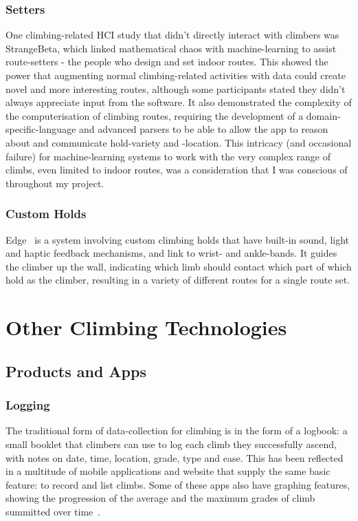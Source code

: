 \subsubsection{Setters}
One climbing-related HCI study that didn't directly interact with climbers was StrangeBeta\cite{strangebeta}, which linked mathematical chaos with machine-learning to assist route-setters - the people who design and set indoor routes.
This showed the power that augmenting normal climbing-related activities with data could create novel and more interesting routes, although some participants stated they didn't always appreciate input from the software.
It also demonstrated the complexity of the computerisation of climbing routes, requiring the development of a domain-specific-language and advanced parsers to be able to allow the app to reason about and communicate hold-variety and -location.
This intricacy (and occasional failure) for machine-learning systems to work with the very complex range of climbs, even limited to indoor routes, was a consideration that I was conscious of throughout my project.


\subsubsection{Custom Holds}
Edge~\cite{edgeinteractive} is a system involving custom climbing holds that have built-in sound, light and haptic feedback mechanisms, and link to wrist- and ankle-bands.
It guides the climber up the wall, indicating which limb should contact which part of which hold as the climber, resulting in a variety of different routes for a single route set.




\section{Other Climbing Technologies}
\subsection{Products and Apps}
\subsubsection{Logging}
The traditional form of data-collection for climbing is in the form of a logbook: a small booklet that climbers can use to log each climb they successfully ascend, with notes on date, time, location, grade, type and ease.
This has been reflected in a multitude of mobile applications and website that supply the same basic feature: to record and list climbs.
Some of these apps also have graphing features, showing the progression of the average and the maximum grades of climb summitted over time~\cite{verticallife}.

